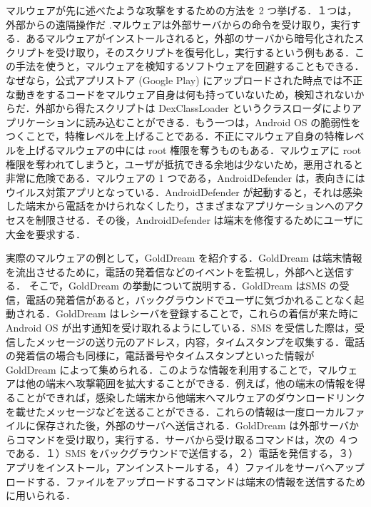 マルウェアが先に述べたような攻撃をするための方法を 2 つ挙げる．１つは，外部からの遠隔操作だ  \cite{remotectrl} .マルウェアは外部サーバからの命令を受け取り，実行する．あるマルウェアがインストールされると，外部のサーバから暗号化されたスクリプトを受け取り，そのスクリプトを復号化し，実行するという例もある．この手法を使うと，マルウェアを検知するソフトウェアを回避することもできる．なぜなら，公式アプリストア (Google Play)  にアップロードされた時点では不正な動きをするコードをマルウェア自身は何も持っていないため，検知されないからだ．外部から得たスクリプトは DexClassLoader というクラスローダによりアプリケーションに読み込むことができる．もう一つは，Android OS の脆弱性をつくことで，特権レベルを上げることである．不正にマルウェア自身の特権レベルを上げるマルウェアの中には root 権限を奪うものもある．マルウェアに root 権限を奪われてしまうと，ユーザが抵抗できる余地は少ないため，悪用されると非常に危険である．マルウェアの 1 つである，AndroidDefender \cite{sopho} は，表向きにはウイルス対策アプリとなっている．AndroidDefender が起動すると，それは感染した端末から電話をかけられなくしたり，さまざまなアプリケーションへのアクセスを制限させる．その後，AndroidDefender は端末を修復するためにユーザに大金を要求する．
 
実際のマルウェアの例として，GoldDream を紹介する．GoldDream は端末情報を流出させるために，電話の発着信などのイベントを監視し，外部へと送信する． そこで，GoldDream の挙動について説明する．GoldDream はSMS の受信，電話の発着信があると，バックグラウンドでユーザに気づかれることなく起動される．GoldDream はレシーバを登録することで，これらの着信が来た時に Android OS が出す通知を受け取れるようにしている．SMS を受信した際は，受信したメッセージの送り元のアドレス，内容，タイムスタンプを収集する．電話の発着信の場合も同様に，電話番号やタイムスタンプといった情報が GoldDream によって集められる．このような情報を利用することで，マルウェアは他の端末へ攻撃範囲を拡大することができる．例えば，他の端末の情報を得ることができれば，感染した端末から他端末へマルウェアのダウンロードリンクを載せたメッセージなどを送ることができる．これらの情報は一度ローカルファイルに保存された後，外部のサーバへ送信される．GoldDream は外部サーバからコマンドを受け取り，実行する．サーバから受け取るコマンドは，次の ４つである．１）SMS をバックグラウンドで送信する，２）電話を発信する，３）アプリをインストール，アンインストールする，４）ファイルをサーバへアップロードする．ファイルをアップロードするコマンドは端末の情報を送信するために用いられる．




